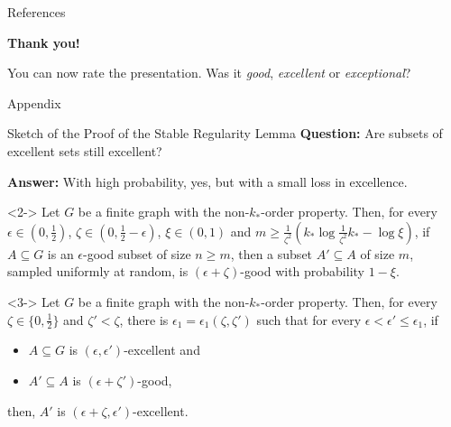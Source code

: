 \documentclass{beamer}
\newcommand{\parcurly}[1]{\{ #1 \}}
\newcommand{\parround}[1]{( #1 )}
\begin{document}

\begin{frame}[allowframebreaks]{References}
    
\end{frame}

\begin{frame}
    \centering
    \Huge{\textbf{Thank you!}}
    \vspace{1em}

    \Large{You can now rate the presentation.
    Was it \emph{good}, \emph{excellent} or \emph{exceptional}?}
\end{frame}


\begin{frame}{Appendix}
\end{frame}%
\begin{frame}{Sketch of the Proof of the Stable Regularity Lemma}
     {
        \textbf{Question:} Are subsets of excellent sets still excellent?
    }

     {
        \textbf{Answer:} With high probability, yes, but with a small loss in excellence.
    }

    \begin{lemma}<2->
        Let $G$ be a finite graph with the non-$k_{*}$-order property.
        Then, for every $\epsilon \in \parround{0, \frac{1}{2}}$,
        $\zeta \in \parround{0, \frac{1}{2} - \epsilon}$, $\xi \in \parround{0, 1}$ and
        $m \geq \frac{1}{\zeta^2}\parround{k_* \log{\frac{1}{\zeta^2}k_*} - \log{\xi}}$,
        if $A \subseteq G$ is an $\epsilon$-good subset of size $n \geq m$,
        then a subset $A' \subseteq A$ of size $m$, sampled uniformly at random, is $(\epsilon + \zeta)$-good with probability $1-\xi$.
    \end{lemma}

    \begin{lemma}<3->
        Let $G$ be a finite graph with the non-$k_{*}$-order property.
        Then, for every $\zeta \in \parcurly{0, \frac{1}{2}}$ and $\zeta' < \zeta$, there is
        $\epsilon_1 = \epsilon_1(\zeta, \zeta')$ such that for every $\epsilon < \epsilon' \leq \epsilon_1$, if
        \begin{itemize}
            \item $A \subseteq G$ is $\parround{\epsilon, \epsilon'}$-excellent and
            \item $A' \subseteq A$ is $\parround{\epsilon + \zeta'}$-good,
        \end{itemize}
        then, $A'$ is $\parround{\epsilon + \zeta, \epsilon'}$-excellent.
    \end{lemma}
\end{frame}
\end{document}
